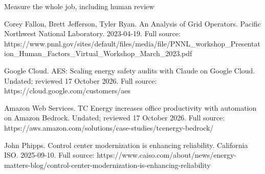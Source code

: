 \begin{frame}[t]{Measure the whole job, including human review}
{Corey Fallon, Brett Jefferson, Tyler Ryan. An Analysis of Grid Operators. Pacific Northwest National Laboratory. 2023-04-19.
Full source: https://www.pnnl.gov/sites/default/files/media/file/PNNL\_workshop\_Presentation\_Human\_Factors\_Virtual\_Workshop\_March\_2023.pdf

Google Cloud. AES: Scaling energy safety audits with Claude on Google Cloud. Undated; reviewed 17 October 2026.
Full source: https://cloud.google.com/customers/aes

Amazon Web Services. TC Energy increases office productivity with automation on Amazon Bedrock. Undated; reviewed 17 October 2026.
Full source: https://aws.amazon.com/solutions/case-studies/tcenergy-bedrock/

John Phipps. Control center modernization is enhancing reliability. California ISO. 2025-09-10.
Full source: https://www.caiso.com/about/news/energy-matters-blog/control-center-modernization-is-enhancing-reliability}
\end{frame}

